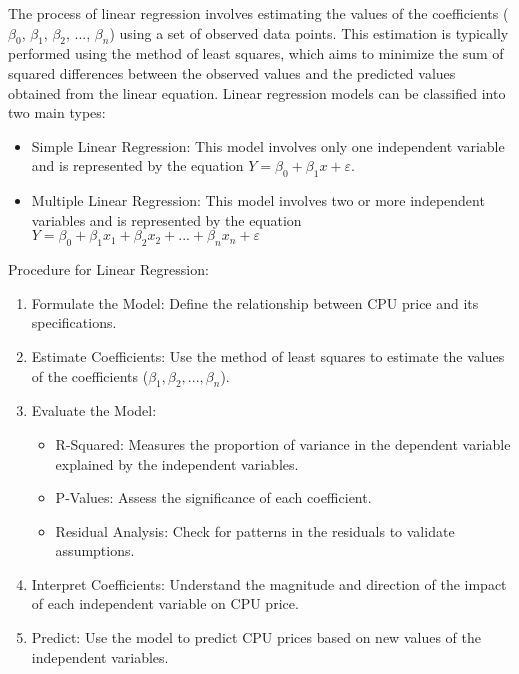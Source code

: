 \vspace*{1cm}

The process of linear regression involves estimating the values of the coefficients ($\beta_0$, $\beta_1$, $\beta_2$, ..., $\beta_n$) using a set of observed data points. This estimation is typically performed using the method of least squares, which aims to minimize the sum of squared differences between the observed values and the predicted values obtained from the linear equation.
Linear regression models can be classified into two main types:

\begin{itemize}
    \item Simple Linear Regression: This model involves only one independent variable and is represented by the equation $ Y = \beta_0 + \beta_1x + \varepsilon  $.
    \item Multiple Linear Regression: This model involves two or more independent variables and is represented by the equation $ Y = \beta_0 + \beta_1x_1 + \beta_2x_2 + ... + \beta_nx_n + \varepsilon  $
\end{itemize}

Procedure for Linear Regression:
\begin{enumerate}
    \item Formulate the Model: Define the relationship between CPU price and its specifications.
    \item Estimate Coefficients: Use the method of least squares to estimate the values of the coefficients ($ \beta_1,  \beta_2, ...,  \beta_n$).
    \item Evaluate the Model:
    \begin{itemize}
        \item R-Squared: Measures the proportion of variance in the dependent variable explained by the independent variables.
        \item P-Values: Assess the significance of each coefficient.
        \item Residual Analysis: Check for patterns in the residuals to validate assumptions.
    \end{itemize}
    \item Interpret Coefficients: Understand the magnitude and direction of the impact of each independent variable on CPU price.
    \item Predict: Use the model to predict CPU prices based on new values of the independent variables.
\end{enumerate}


